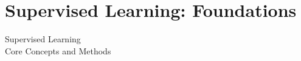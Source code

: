 \documentclass[11pt]{beamer}
\begin{document}






\section{Supervised Learning: Foundations}

\begin{frame}
	\begin{center}
		\Large
		Supervised Learning\\
		\vspace{0.5cm}
		\normalsize
		Core Concepts and Methods
	\end{center}
\end{frame}
\end{document}
